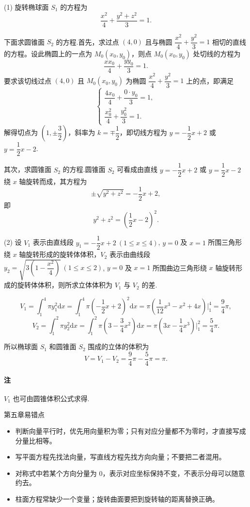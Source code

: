 \begin{solution}
    (1) 旋转椭球面 $S_1$ 的方程为
\[
\dfrac{x^2}{4}+\dfrac{y^2+z^2}{3}=1.
\]

下面求圆锥面 $S_2$ 的方程.首先，求过点 $(4,0)$ 且与椭圆 $\dfrac{x^2}{4}+\dfrac{y^2}{3}=1$ 相切的直线的方程。设此椭圆上的一点为 $M_0(x_0,y_0)$，则点 $M_0(x_0,y_0)$ 处切线的方程为
\[
\dfrac{xx_0}{4}+\dfrac{yy_0}{3}=1.
\]
要求该切线过点 $(4,0)$ 且 $M_0(x_0,y_0)$ 为椭圆 $\dfrac{x^2}{4}+\dfrac{y^2}{3}=1$ 上的点，即满足
\[
\begin{cases}
\dfrac{4x_0}{4}+\dfrac{0\cdot y_0}{3}=1, \\
\dfrac{x_0^2}{4}+\dfrac{y_0^2}{3}=1.
\end{cases}
\]
解得切点为 $\left(1,\pm\dfrac{3}{2}\right)$，斜率为 $k=\mp\dfrac{1}{2}$，即切线方程为 $y=-\dfrac{1}{2}x+2$ 或 $y=\dfrac{1}{2}x-2$.

其次，求圆锥面 $S_2$ 的方程.圆锥面 $S_2$ 可看成由直线 $y=-\dfrac{1}{2}x+2$ 或 $y=\dfrac{1}{2}x-2$ 绕 $x$ 轴旋转而成，其方程为
\[
\pm\sqrt{y^2+z^2}=-\dfrac{1}{2}x+2,
\]
即
\[
y^2+z^2=\left(\dfrac{1}{2}x-2\right)^2.
\]

(2) 设 $V_1$ 表示由直线段 $y_1=-\dfrac{1}{2}x+2\ (1\leqslant x\leqslant4)$, $y=0$ 及 $x=1$ 所围三角形绕 $x$ 轴旋转形成的旋转体体积，$V_2$ 表示由曲线段 $y_2=\sqrt{3\left(1-\dfrac{x^2}{4}\right)}\ (1\leqslant x\leqslant2)$, $y=0$ 及 $x=1$ 所围曲边三角形绕 $x$ 轴旋转形成的旋转体体积，则所求立体体积为 $V_1$ 与 $V_2$ 的差.

\[
V_1 = \int_{1}^{4} \pi y_1^2 \mathrm{d}x = \int_{1}^{4} \pi \left(-\dfrac{1}{2}x+2\right)^2 \mathrm{d}x = \pi\left(\dfrac{1}{12}x^3 - x^2 + 4x\right)\bigg|_{1}^{4} = \dfrac{9}{4}\pi,
\]
\[
V_2 = \int_{1}^{2} \pi y_2^2 \mathrm{d}x = \int_{1}^{2} \pi \left(3-\dfrac{3}{4}x^2\right) \mathrm{d}x = \pi\left(3x-\dfrac{1}{4}x^3\right)\bigg|_{1}^{2} = \dfrac{5}{4}\pi.
\]

所以椭球面 $S_1$ 和圆锥面 $S_2$ 围成的立体的体积为
\[
V = V_1 - V_2 = \dfrac{9}{4}\pi - \dfrac{5}{4}\pi = \pi.
\]

\paragraph{注}
$V_1$ 也可由圆锥体积公式求得.
\end{solution}

\begin{warningbox}{第五章易错点}
\begin{itemize}
  \item 判断向量平行时，优先用向量积为零；只有对应分量都不为零时，才直接写成分量比相等。
  \item 写平面方程先找法向量，写直线方程先找方向向量；不要把二者混用。
  \item 对称式中若某个方向分量为 $0$，表示对应坐标保持不变，不表示分母可以随意约去。
  \item 柱面方程常缺少一个变量；旋转曲面要把到旋转轴的距离替换正确。
\end{itemize}
\end{warningbox}
